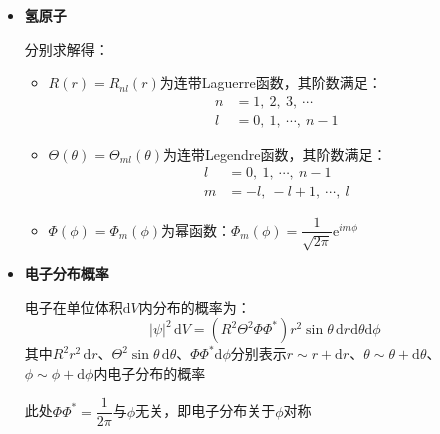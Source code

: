 \documentclass{beamer}
\newenvironment{slide}{
    \begin{frame}{\bfseries{\sectiontitle}}
}{
    \end{frame}
}
\begin{document}
\begin{slide}
    \begin{itemize}
        \item \textbf{氢原子}

        分别求解得：
        \begin{itemize}
            \item $R(r)=R_{nl}(r)$为连带Laguerre函数，其阶数满足：
            \begin{align*}
                n &= 1,\ 2,\ 3,\ \cdots \\
                l &= 0,\ 1,\ \cdots,\ n-1
            \end{align*}
            \item $\Theta(\theta)=\Theta_{ml}(\theta)$为连带Legendre函数，其阶数满足：
            \begin{align*}
                l &= 0,\ 1,\ \cdots,\ n-1 \\
                m &= -l,\ -l+1,\ \cdots,\ l
            \end{align*}
            \item $\Phi(\phi)=\Phi_m(\phi)$为幂函数：$\Phi_m(\phi)=\dfrac{1}{\sqrt{2\pi}}\mathrm{e}^{im\phi}$
        \end{itemize}
    \end{itemize}
\end{slide}

\begin{slide}
    \begin{itemize}
        \item \textbf{电子分布概率}

        电子在单位体积$\mathrm{d}V$内分布的概率为：
        \[
            |\psi|^2\,\mathrm{d}V = \left(R^2\Theta^2\Phi\Phi^*\right)r^2\sin\theta\,\mathrm{d}r\mathrm{d}\theta\mathrm{d}\phi
        \]
        其中$R^2r^2\,\mathrm{d}r$、$\Theta^2\sin\theta\,\mathrm{d}\theta$、$\Phi\Phi^*\mathrm{d}\phi$分别表示$r\sim r+\mathrm{d}r$、$\theta\sim\theta+\mathrm{d}\theta$、$\phi\sim\phi+\mathrm{d}\phi$内电子分布的概率

        此处$\Phi\Phi^*=\dfrac{1}{2\pi}$与$\phi$无关，即电子分布关于$\phi$对称
    \end{itemize}
\end{slide}
\end{document}
